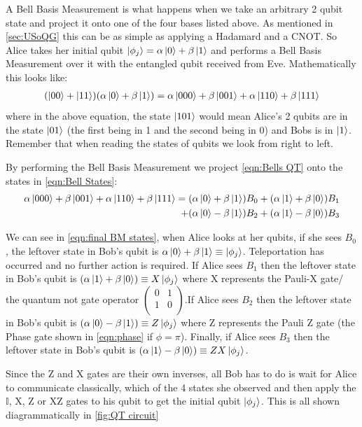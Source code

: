 A Bell Basis Measurement is what happens when we take an arbitrary 2 qubit state and project it onto one of the four bases listed above. As mentioned in \cref{sec:USoQG} this can be as simple as applying a Hadamard and a CNOT. So Alice takes her initial qubit $\ket{\phi_j} = \alpha\ket{0} + \beta\ket{1}$ and performs a Bell Basis Measurement over it with the entangled qubit received from Eve. Mathematically this looks like:
\begin{align} \label{eqn:Bells QT}
    (\ket{00} + \ket{11})(\alpha\ket{0} + \beta\ket{1}) = \alpha\ket{000} + \beta\ket{001} + \alpha\ket{110} + \beta\ket{111}
\end{align}
where in the above equation, the state $\ket{101}$ would mean Alice's 2 qubits are in the state $\ket{01}$ (the first being in 1 and the second being in 0) and Bobs is in $\ket{1}$. Remember that when reading the states of qubits we look from right to left. 

By performing the Bell Basis Measurement we project \cref{eqn:Bells QT} onto the states in \cref{eqn:Bell States}:
\begin{align}\label{eqn:final BM states}
    \alpha\ket{000} + \beta\ket{001} + \alpha\ket{110} + \beta\ket{111} = (\alpha\ket{0} + \beta\ket{1})B_0 + (\alpha\ket{1} + \beta\ket{0})B_1 \\ +(\alpha\ket{0} - \beta\ket{1})B_2 + (\alpha\ket{1} - \beta\ket{0})B_3 
\end{align}

We can see in \cref{eqn:final BM states}, when Alice looks at her qubits, if she sees $B_0$, the leftover state in Bob's qubit is $\alpha\ket{0} + \beta\ket{1} \equiv \ket{\phi_j}$. Teleportation has occurred and no further action is required. If Alice sees $B_1$ then the leftover state in Bob's qubit is $(\alpha\ket{1} + \beta\ket{0}) \equiv X\ket{\phi_j}$ where X represents the Pauli-X gate/ the quantum not gate operator $
\begin{pmatrix}
    0 & 1\\
    1 & 0\\
\end{pmatrix}$.If Alice sees $B_2$ then the leftover state in Bob's qubit is $(\alpha\ket{0} - \beta\ket{1}) \equiv Z\ket{\phi_j}$ where Z represents the Pauli Z gate (the Phase gate shown in \cref{eqn:phase} if $\phi = \pi$). Finally, if Alice sees $B_3$ then the leftover state in Bob's qubit is $(\alpha\ket{1} - \beta\ket{0}) \equiv ZX\ket{\phi_j}$. 

Since the Z and X gates are their own inverses, all Bob has to do is wait for Alice to communicate classically, which of the 4 states she observed and then apply the $\mathbb{I}$, X, Z or XZ gates to his qubit to get the initial qubit $\ket{\phi_j}$. This is all shown diagrammatically in \cref{fig:QT circuit}

